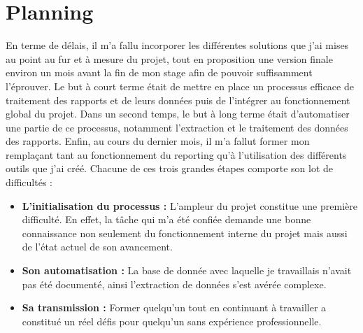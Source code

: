\section{Planning}
En terme de délais, il m'a fallu incorporer les différentes solutions que j'ai mises au point au fur et à mesure du projet, tout en proposition une version finale environ un mois avant la fin de mon stage afin de pouvoir suffisamment l'éprouver.
Le but à court terme était de mettre en place un processus efficace de traitement des rapports et de leurs données puis de l'intégrer au fonctionnement global du projet.
Dans un second temps, le but à long terme était d'automatiser une partie de ce processus, notamment l'extraction et le traitement des données des rapports. 
Enfin, au cours du dernier mois, il m'a fallut former mon remplaçant tant au fonctionnement du \gls{reporting} qu'à l'utilisation des différents outils que j'ai créé.
Chacune de ces trois grandes étapes comporte son lot de difficultés :
\begin{itemize}
\item \textbf{L'initialisation du processus :} L'ampleur du projet constitue une première difficulté. En effet, la tâche qui m'a été confiée demande une bonne connaissance non seulement du fonctionnement interne du projet mais aussi de l'état actuel de son avancement.
\item \textbf{Son automatisation :} La base de donnée avec laquelle je travaillais n'avait pas été documenté, ainsi l'extraction de données s'est avérée complexe.
\item \textbf{Sa transmission :} Former quelqu'un tout en continuant à travailler a constitué un réel défis pour quelqu'un sans expérience professionnelle. 
\end{itemize}
